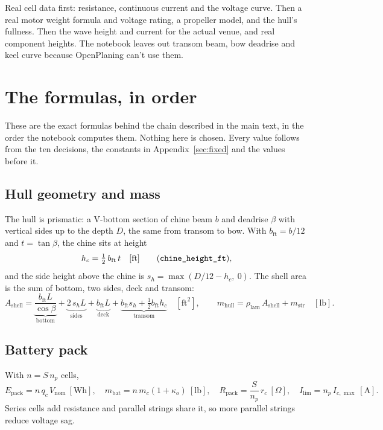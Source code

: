 \documentclass[11pt,a4paper]{article}
\renewcommand{\_}{\textunderscore\allowbreak}
\newcommand{\code}[1]{\texttt{#1}}
\newcommand{\Epack}{E_{\mathrm{pack}}}
\newcommand{\Rpack}{R_{\mathrm{pack}}}
\begin{document}
Real cell data first: resistance, continuous current and the voltage curve. Then a real motor weight formula and voltage rating, a propeller model, and the hull's fullness. Then the wave height and current for the actual venue,
and real component heights. The notebook leaves out transom beam, bow deadrise and keel curve because OpenPlaning can't use them.

\appendix
\section{The formulas, in order}
\label{sec:calculated}

These are the exact formulas behind the chain described in the main text, in the order the notebook computes them. Nothing here is
chosen. Every value follows from the ten decisions, the constants in Appendix~\ref{sec:fixed} and the values before it.

\subsection{Hull geometry and mass}
The hull is prismatic: a V-bottom section of chine beam $b$ and deadrise $\beta$ with vertical sides up to the depth $D$,
the same from transom to bow. With $b_{\mathrm{ft}}=b/12$ and $t=\tan\beta$, the chine sits at height
\begin{equation}
  h_c = \tfrac12\, b_{\mathrm{ft}}\, t \quad[\mathrm{ft}] \qquad (\code{chine\_height\_ft}),
  \label{eq:chine}
\end{equation}
and the side height above the chine is $s_h = \max(D/12 - h_c,\ 0)$. The shell area is the sum of bottom, two sides, deck and transom:
\begin{equation}
  A_{\mathrm{shell}} = \underbrace{\frac{b_{\mathrm{ft}}L}{\cos\beta}}_{\text{bottom}}
  + \underbrace{2\,s_h L}_{\text{sides}} + \underbrace{b_{\mathrm{ft}}L}_{\text{deck}}
  + \underbrace{b_{\mathrm{ft}}s_h + \tfrac12 b_{\mathrm{ft}}h_c}_{\text{transom}} \quad[\mathrm{ft}^2],
  \qquad
  m_{\mathrm{hull}} = \rho_{\mathrm{lam}}\,A_{\mathrm{shell}} + m_{\mathrm{str}} \quad[\mathrm{lb}].
  \label{eq:hull}
\end{equation}

\subsection{Battery pack}
With $n = S\,n_p$ cells,
\begin{equation}
  \Epack = n\,q_c\,V_{\mathrm{nom}}\ [\mathrm{Wh}], \quad
  m_{\mathrm{bat}} = n\,m_c(1+\kappa_o)\ [\mathrm{lb}], \quad
  \Rpack = \frac{S}{n_p}\,r_c\ [\Omega], \quad
  I_{\lim} = n_p\,I_{c,\max}\ [\mathrm A].
  \label{eq:pack}
\end{equation}
Series cells add resistance and parallel strings share it, so more parallel strings reduce voltage sag.
\end{document}
